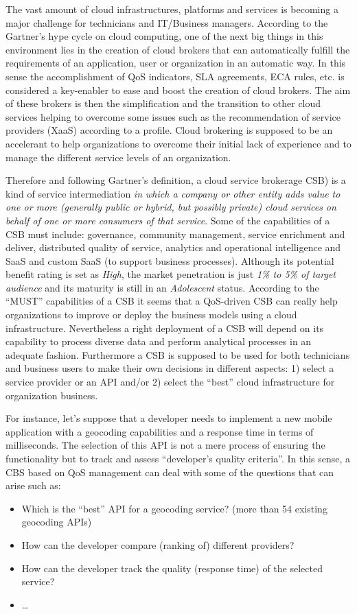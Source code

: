 The vast amount of cloud infrastructures, platforms and services is 
becoming a major challenge for technicians and IT/Business managers. According 
to the Gartner's hype cycle on cloud computing, one of the next big things in this environment lies in the creation 
of cloud brokers that can automatically fulfill the requirements of an application, user 
or organization in an automatic way. In this sense the accomplishment of QoS indicators, 
SLA agreements, ECA rules, etc. is considered a key-enabler to ease and boost the creation 
of cloud brokers. The aim of these brokers is then the simplification and 
the transition to other cloud services helping to overcome some issues such as 
the recommendation of service providers (XaaS)  according to a profile. Cloud brokering 
is supposed to be an accelerant to help organizations to overcome their initial lack 
of experience and to manage the different service levels of an organization.

Therefore and following Gartner's definition, a cloud service brokerage CSB) is a kind of service intermediation 
\textit{in which a company or other entity adds value to one or more (generally public or hybrid, but possibly private) 
cloud services on behalf of one or more consumers of that service}. Some of the capabilities of a 
CSB must include: governance, community management, service enrichment and deliver, distributed quality of service, 
analytics and operational intelligence and SaaS and custom SaaS (to support business processes). 
Although its potential benefit rating is set as \textit{High}, the market penetration is just \textit{1\% to 5\% of target audience} 
and its maturity is still in an \textit{Adolescent} status. According to the ``MUST'' capabilities of a CSB it 
seems that a QoS-driven CSB can really help organizations to improve or deploy the business models 
using a cloud infrastructure. Nevertheless a right deployment of a CSB will depend on its capability 
to process diverse data and perform analytical processes in an adequate fashion. Furthermore 
a CSB is supposed to be used for both technicians and business users to make their 
own decisions in different aspects: 1) select a service provider or an API and/or 2) select 
the ``best'' cloud infrastructure for organization business.

For instance, let's suppose that a developer needs to implement a new mobile application 
with a geocoding capabilities and a response time in terms of milliseconds. The selection of this 
API is not a mere process of ensuring the functionality but to track 
and assess ``developer's quality criteria''. In this sense, a CBS based on QoS management can 
deal with some of the questions that can arise such as:
\begin{itemize}
 \item Which is the ``best'' API for a geocoding service? (more than 54 existing geocoding APIs) 
 \item How can the developer compare (ranking of) different providers? 
 \item How can the developer track the quality (response time) of the selected service?
 \item \ldots
\end{itemize}

